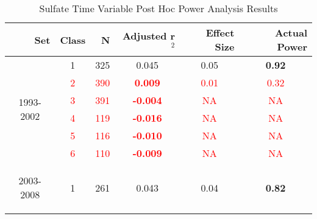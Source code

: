 \begin{table}\tiny
  \centering
  \caption{Sulfate Time Variable Post Hoc Power Analysis Results}
    \begin{tabular}{rrrrrr}
    \toprule
    Set   & Class & N     & Adjusted r$^2$ & \multicolumn{1}{p{.5cm}}{Effect Size} & Actual Power \\
    \midrule
    \multicolumn{1}{c}{\multirow{6}[1]{*}{\begin{sideways}1993-2002\end{sideways}}} & \multicolumn{1}{c}{1} & \multicolumn{1}{c}{325} & \multicolumn{1}{c}{0.045 } & \multicolumn{1}{c}{0.05 } & \multicolumn{1}{c}{\textbf{0.92}} \\
    \multicolumn{1}{c}{} & \multicolumn{1}{c}{\textcolor{red}{2}} & \multicolumn{1}{c}{\textcolor{red}{390}} & \multicolumn{1}{c}{\textcolor{red}{\textbf{0.009}}} & \multicolumn{1}{c}{\textcolor{red}{0.01}} & \multicolumn{1}{c}{\textcolor{red}{0.32 }} \\
    \multicolumn{1}{c}{} & \multicolumn{1}{c}{\textcolor{red}{3}} & \multicolumn{1}{c}{\textcolor{red}{391}} & \multicolumn{1}{c}{\textcolor{red}{\textbf{-0.004}}} & \multicolumn{1}{c}{ \textcolor{red}{NA}} & \multicolumn{1}{c}{\textcolor{red}{NA}} \\
    \multicolumn{1}{c}{} & \multicolumn{1}{c}{\textcolor{red}{4}} & \multicolumn{1}{c}{\textcolor{red}{119}} & \multicolumn{1}{c}{\textcolor{red}{\textbf{-0.016}}} & \multicolumn{1}{c}{\textcolor{red}{NA}} & \multicolumn{1}{c}{\textcolor{red}{NA}} \\
    \multicolumn{1}{c}{} & \multicolumn{1}{c}{\textcolor{red}{5}} & \multicolumn{1}{c}{\textcolor{red}{116}} & \multicolumn{1}{c}{\textcolor{red}{\textbf{-0.010}}} & \multicolumn{1}{c}{\textcolor{red}{NA}} & \multicolumn{1}{c}{\textcolor{red}{NA}} \\
    \multicolumn{1}{c}{} & \multicolumn{1}{c}{\textcolor{red}{6}} & \multicolumn{1}{c}{\textcolor{red}{110}} & \multicolumn{1}{c}{\textcolor{red}{\textbf{-0.009}}} & \multicolumn{1}{c}{\textcolor{red}{NA}} & \multicolumn{1}{c}{\textcolor{red}{NA}} \\\midrule
    \multicolumn{1}{c}{\multirow{6}[2]{*}{\begin{sideways}2003-2008\end{sideways}}} & \multicolumn{1}{c}{1} & \multicolumn{1}{c}{261} & \multicolumn{1}{c}{0.043 } & \multicolumn{1}{c}{0.04 } & \multicolumn{1}{c}{\textbf{0.82}} \\

\end{tabular}
\end{table}

